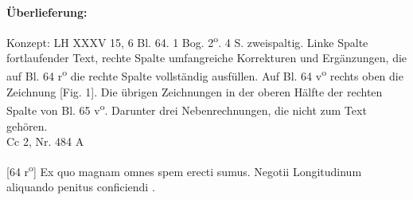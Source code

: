    
        
        \begin{ledgroupsized}[r]{120mm}
        \footnotesize 
        \pstart        
        \noindent\textbf{\"{U}berlieferung:}  
        \pend
        \end{ledgroupsized}
      
       
              \begin{ledgroupsized}[r]{114mm}
              \footnotesize 
              \pstart \parindent -6mm
              Konzept: LH XXXV 15, 6 Bl. 64. 1 Bog. 2\textsuperscript{o}. 4 S. zweispaltig. Linke Spalte fortlaufender Text, rechte Spalte umfangreiche Korrekturen und Erg\"{a}nzungen, die auf Bl. 64 r\textsuperscript{o} die rechte Spalte vollst\"{a}ndig ausf\"{u}llen. Auf Bl. 64 v\textsuperscript{o} rechts oben die Zeichnung [Fig. 1]. Die \"{u}brigen Zeichnungen in der oberen H\"{a}lfte der rechten Spalte von Bl. 65 v\textsuperscript{o}. Darunter drei Nebenrechnungen, die nicht zum Text geh\"{o}ren.\\Cc 2, Nr. 484 A \pend
              \end{ledgroupsized}
        \vspace*{8mm}
        \pstart 
        \normalsize
      [64 r\textsuperscript{o}] Ex quo  magnam omnes spem erecti sumus. Negotii Longitudinum\protect{} aliquando penitus conficiendi .
